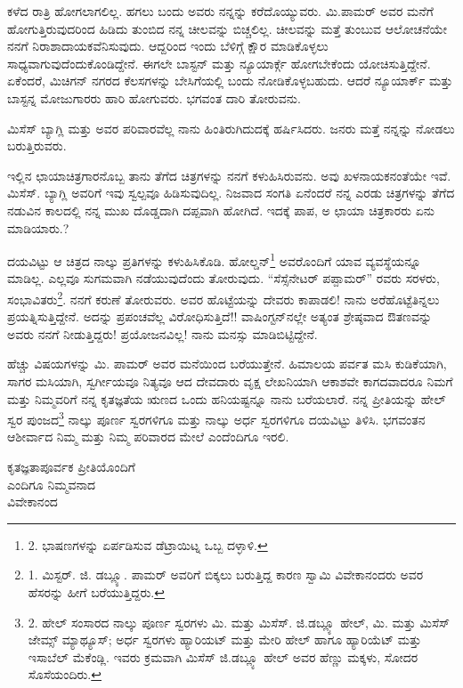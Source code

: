 ಕಳೆದ ರಾತ್ರಿ ಹೋಗಲಾಗಲಿಲ್ಲ. ಹಗಲು ಬಂದು ಅವರು ನನ್ನನ್ನು ಕರೆದೊಯ್ಯುವರು. ಮಿ.ಪಾಮರ್ ಅವರ ಮನೆಗೆ ಹೋಗುತ್ತಿರುವುದರಿಂದ ಹಿಡಿದು ತುಂಬಿದ ನನ್ನ ಚೀಲವನ್ನು ಬಿಚ್ಚಲಿಲ್ಲ. ಚೀಲವನ್ನು ಮತ್ತೆ ತುಂಬುವ ಆಲೋಚನೆಯೇ ನನಗೆ ನಿರಾಶಾದಾಯಕವೆನಿಸುವುದು. ಆದ್ದರಿಂದ ಇಂದು ಬೆಳಿಗ್ಗೆ ಕ್ಷೌರ ಮಾಡಿಕೊಳ್ಳಲು ಸಾಧ್ಯವಾಗುವುದೆಂದುಕೊಂಡಿದ್ದೇನೆ. ಈಗಲೇ ಬಾಸ್ಟನ್ ಮತ್ತು ನ್ಯೂಯಾರ್ಕ್ಗೆ ಹೋಗಬೇಕೆಂದು ಯೋಚಿಸುತ್ತಿದ್ದೇನೆ. ಏಕೆಂದರೆ, ಮಿಚಿಗನ್ ನಗರದ ಕೆಲಸಗಳನ್ನು ಬೇಸಿಗೆಯಲ್ಲಿ ಬಂದು ನೋಡಿಕೊಳ್ಳಬಹುದು. ಆದರೆ ನ್ಯೂಯಾರ್ಕ್ ಮತ್ತು ಬಾಸ್ಟನ್ನ ಮೋಜುಗಾರರು ಹಾರಿ ಹೋಗುವರು. ಭಗವಂತ ದಾರಿ ತೋರುವನು.

ಮಿಸೆಸ್ ಬ್ಯಾಗ್ಲಿ ಮತ್ತು ಅವರ ಪರಿವಾರವೆಲ್ಲ ನಾನು ಹಿಂತಿರುಗಿದುದಕ್ಕೆ ಹರ್ಷಿಸಿದರು. ಜನರು ಮತ್ತೆ ನನ್ನನ್ನು ನೋಡಲು ಬರುತ್ತಿರುವರು.

ಇಲ್ಲಿನ ಛಾಯಾಚಿತ್ರಗಾರನೊಬ್ಬ ತಾನು ತೆಗೆದ ಚಿತ್ರಗಳನ್ನು ನನಗೆ ಕಳುಹಿಸಿರುವನು. ಅವು ಖಳನಾಯಕನಂತೆಯೇ ಇವೆ. ಮಿಸೆಸ್. ಬ್ಯಾಗ್ಲಿ ಅವರಿಗೆ ಇವು ಸ್ವಲ್ಪವೂ ಹಿಡಿಸುವುದಿಲ್ಲ. ನಿಜವಾದ ಸಂಗತಿ ಏನೆಂದರೆ ನನ್ನ ಎರಡು ಚಿತ್ರಗಳನ್ನು ತೆಗೆದ ನಡುವಿನ ಕಾಲದಲ್ಲಿ ನನ್ನ ಮುಖ ದೊಡ್ಡದಾಗಿ ದಪ್ಪವಾಗಿ ಹೋಗಿದೆ. ಇದಕ್ಕೆ ಪಾಪ, ಅ ಛಾಯಾ ಚಿತ್ರಕಾರರು ಏನು ಮಾಡಿಯಾರು.?

ದಯವಿಟ್ಟು ಆ ಚಿತ್ರದ ನಾಲ್ಕು ಪ್ರತಿಗಳನ್ನು ಕಳುಹಿಸಿಕೊಡಿ. ಹೋಲ್ಡನ್\footnote{2. ಭಾಷಣಗಳನ್ನು ಏರ್ಪಡಿಸುವ ಡೆಟ್ರಾಯಿಟ್ನ ಒಬ್ಬ ದಳ್ಳಾಳಿ.} ಅವರೊಂದಿಗೆ ಯಾವ ವ್ಯವಸ್ಥೆಯನ್ನೂ ಮಾಡಿಲ್ಲ. ಎಲ್ಲವೂ ಸುಗಮವಾಗಿ ನಡೆಯುವುದೆಂದು ತೋರುವುದು. “ಸೆಸ್ಸೆನೇಟರ್ ಪಪ್ಪಾಮರ್” ರವರು ಸರಳರು, ಸಂಭಾವಿತರು\footnote{1. ಮಿಸ್ಟರ್. ಜಿ. ಡಬ್ಲ್ಯೂ. ಪಾಮರ್ ಅವರಿಗೆ ಬಿಕ್ಕಲು ಬರುತ್ತಿದ್ದ ಕಾರಣ ಸ್ವಾಮಿ ವಿವೇಕಾನಂದರು ಅವರ ಹೆಸರನ್ನು ಹೀಗೆ ಬರೆಯುತ್ತಿದ್ದರು.}. ನನಗೆ ಕರುಣೆ ತೋರುವರು. ಅವರ ಹೊಟ್ಟೆಯನ್ನು ದೇವರು ಕಾಪಾಡಲಿ! ನಾನು ಅರೆಹೊಟ್ಟೆತಿನ್ನಲು ಪ್ರಯತ್ನಿಸುತ್ತಿದ್ದೇನೆ. ಅದನ್ನು ಪ್ರಪಂಚವೆಲ್ಲ ವಿರೋಧಿಸುತ್ತಿದೆ!! ವಾಷಿಂಗ್ಟನ್‌ನಲ್ಲೇ ಅತ್ಯಂತ ಶ್ರೇಷ್ಠವಾದ ಔತಣವನ್ನು ಅವರು ನನಗೆ ನೀಡುತ್ತಿದ್ದರು! ಪ್ರಯೋಜನವಿಲ್ಲ! ನಾನು ಮನಸ್ಸು ಮಾಡಿಬಿಟ್ಟಿದ್ದೇನೆ.

ಹೆಚ್ಚು ವಿಷಯಗಳನ್ನು ಮಿ. ಪಾಮರ್ ಅವರ ಮನೆಯಿಂದ ಬರೆಯುತ್ತೇನೆ. ಹಿಮಾಲಯ ಪರ್ವತ ಮಸಿ ಕುಡಿಕೆಯಾಗಿ, ಸಾಗರ ಮಸಿಯಾಗಿ, ಸ್ವರ್ಗೀಯವೂ ನಿತ್ಯವೂ ಆದ ದೇವದಾರು ವೃಕ್ಷ ಲೇಖನಿಯಾಗಿ ಆಕಾಶವೇ ಕಾಗದವಾದರೂ ನಿಮಗೆ ಮತ್ತು ನಿಮ್ಮವರಿಗೆ ನನ್ನ ಕೃತಜ್ಞತೆಯ ಋಣದ ಒಂದು ಹನಿಯಷ್ಟನ್ನೂ ನಾನು ಬರೆಯಲಾರೆ. ನನ್ನ ಪ್ರೀತಿಯನ್ನು ಹೇಲ್ ಸ್ವರ ಪುಂಜದ\footnote{2. ಹೇಲ್ ಸಂಸಾರದ ನಾಲ್ಕು ಪೂರ್ಣ ಸ್ವರಗಳು ಮಿ. ಮತ್ತು ಮಿಸೆಸ್. ಜಿ.ಡಬ್ಲ್ಯೂ ಹೇಲ್, ಮಿ. ಮತ್ತು ಮಿಸೆಸ್ ಜೇಮ್ಸ್ ಮ್ಯಾಥ್ಯೂಸ್; ಅರ್ಧ ಸ್ವರಗಳು ಹ್ಯಾರಿಯಟ್ ಮತ್ತು ಮೇರಿ ಹೇಲ್ ಹಾಗೂ ಹ್ಯಾರಿಯೆಟ್ ಮತ್ತು ಇಸಾಬೆಲ್ ಮೆಕೆಂಡ್ಲಿ. ಇವರು ಕ್ರಮವಾಗಿ ಮಿಸೆಸ್ ಜಿ.ಡಬ್ಲ್ಯೂ ಹೇಲ್ ಅವರ ಹೆಣ್ಣು ಮಕ್ಕಳು, ಸೋದರ ಸೊಸೆಯಂದಿರು.} ನಾಲ್ಕು ಪೂರ್ಣ ಸ್ವರಗಳಿಗೂ ಮತ್ತು ನಾಲ್ಕು ಅರ್ಧ ಸ್ವರಗಳಿಗೂ ದಯವಿಟ್ಟು ತಿಳಿಸಿ. ಭಗವಂತನ ಆಶೀರ್ವಾದ ನಿಮ್ಮ ಮತ್ತು ನಿಮ್ಮ ಪರಿವಾರದ ಮೇಲೆ ಎಂದೆಂದಿಗೂ ಇರಲಿ.

\begin{flushright}
ಕೃತಜ್ಞತಾಪೂರ್ವಕ ಪ್ರೀತಿಯೊಂದಿಗೆ\\ಎಂದಿಗೂ ನಿಮ್ಮವನಾದ\\ವಿವೇಕಾನಂದ
\end{flushright}

